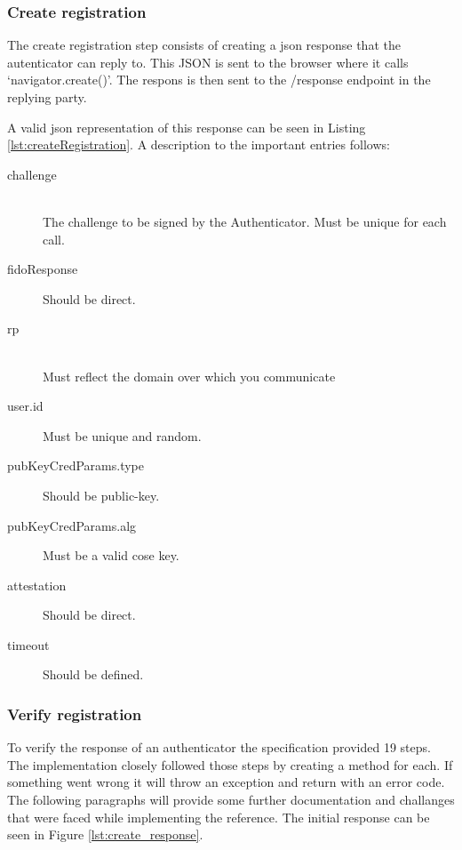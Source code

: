 \documentclass[a4paper, 11pt]{scrartcl}
\begin{document}
\subsubsection{Create registration}

The create registration step consists of creating a \gls{json} response that the autenticator can reply to. This JSON is sent to the browser where it calls `navigator.create()'. The respons is then sent to the /response endpoint in the replying party.

A valid \gls{json} representation of this response can be seen in Listing \ref{lst:createRegistration}. A description to the important entries follows:

\begin{description}
  \item[challenge] \hfill \\ The challenge to be signed by the Authenticator. Must be unique for each call.
  \item[fidoResponse] Should be direct. 
  \item[rp] \hfill \\ Must reflect the domain over which you communicate
  \item[user.id] Must be unique and random. 
  \item[pubKeyCredParams.type] Should be public-key. 
  \item[pubKeyCredParams.alg] Must be a valid \gls{cose} key. \cite{cose}
  \item[attestation] Should be direct.
  \item[timeout] Should be defined.   
\end{description}



\subsubsection{Verify registration}

To verify the response of an authenticator the specification provided 19 steps. The implementation closely followed those steps by creating a method for each. If something went wrong it will throw an exception and return with an error code. The following paragraphs will provide some further documentation and challanges that were faced while implementing the reference. The initial response can be seen in Figure \ref{lst:create_response}.
\end{document}
